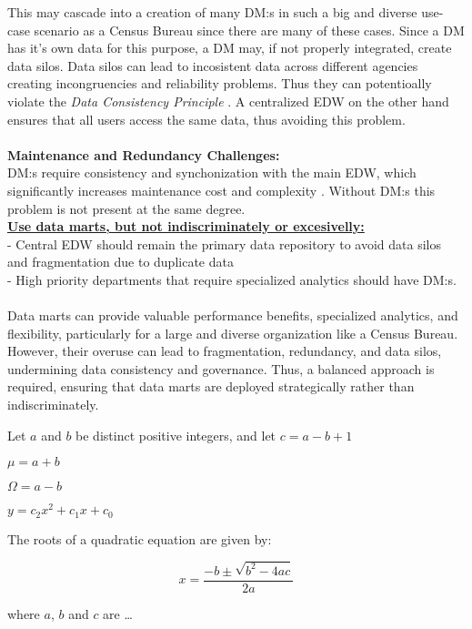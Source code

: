 This may cascade into a creation of many DM:s in such a big and diverse use-case scenario as a Census Bureau since there are many of these cases.
Since a DM has it's own data for this purpose, a DM may, if not properly integrated, create data silos.
Data silos can lead to incosistent data across different agencies creating incongruencies and reliability problems.
Thus they can potentioally violate the \textit{Data Consistency Principle} \cite{l3video}.
A centralized EDW on the other hand ensures that all users access the same data, thus avoiding this problem.
\\\\\textbf{Maintenance and Redundancy Challenges:}\\
DM:s require consistency and synchonization with the main EDW, which significantly increases maintenance cost and complexity \cite[p.1230]{CourseLitt}.
Without DM:s this problem is not present at the same degree.\\


\textbf{\underline{Use data marts, but not indiscriminately or excesivelly:}}\\
- Central EDW should remain the primary data repository to avoid data silos and fragmentation due to duplicate data\\
- High priority departments that require specialized analytics should have DM:s.\\
\\Data marts can provide valuable performance benefits, specialized analytics, and flexibility, 
particularly for a large and diverse organization like a Census Bureau. 
However, their overuse can lead to fragmentation, redundancy, and data silos, 
undermining data consistency and governance. Thus, a balanced approach is required, 
ensuring that data marts are deployed strategically rather than indiscriminately.

\newpage 
Let $a$ and $b$ be distinct positive integers, and let $c = a - b + 1$

$\mu = a + b $


$\Omega = a - b $

$y = c_2 x^2 + c_1 x + c_0 $

The roots of a quadratic equation are given by:

\begin{equation}
x = \frac{-b \pm \sqrt{b^2 - 4ac}} {2a}
\end{equation}

where $a$, $b$ and $c$ are \ldots
